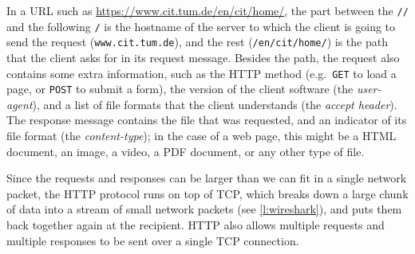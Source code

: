 In a URL such as \url{https://www.cit.tum.de/en/cit/home/}, the part between the \verb|//| and the following \verb|/| is the hostname of the server to which the client is going to send the request (\texttt{www.cit.tum.de}), and the rest (\texttt{/en/cit/home/}) is the path that the client asks for in its request message.
Besides the path, the request also contains some extra information, such as the HTTP method (e.g.\ \texttt{GET} to load a page, or \texttt{POST} to submit a form), the version of the client software (the \emph{user-agent}), and a list of file formats that the client understands (the \emph{accept header}).
The response message contains the file that was requested, and an indicator of its file format (the \emph{content-type}); in the case of a web page, this might be a HTML document, an image, a video, a PDF document, or any other type of file.

\begin{frame}[plain]
    \label{s:http-capture}
\end{frame}
\label{l:http-capture}

Since the requests and responses can be larger than we can fit in a single network packet, the HTTP protocol runs on top of TCP, which breaks down a large chunk of data into a stream of small network packets (see \autoref{l:wireshark}), and puts them back together again at the recipient.
HTTP also allows multiple requests and multiple responses to be sent over a single TCP connection.

